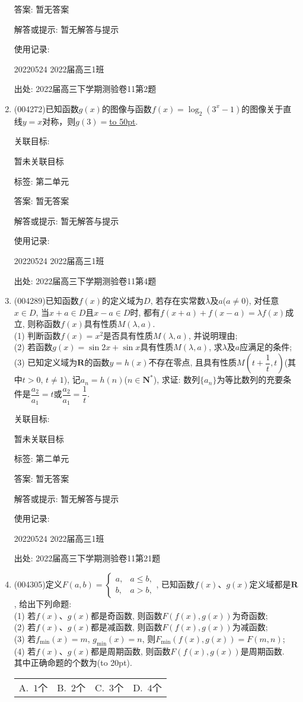 \documentclass[10pt,a4paper]{article}
\newcommand{\blank}[1]{\underline{\hbox to #1pt{}}}
\newcommand{\bracket}[1]{(\hbox to #1pt{})}
\newcommand{\fourch}[4]{\par\begin{tabular}{p{.23\textwidth}p{.23\textwidth}p{.23\textwidth}p{.23\textwidth}}
A.~#1 &B.~#2& C.~#3& D.~#4
\end{tabular}}
\begin{document}
\begin{enumerate}[1.]
答案: 暂无答案

解答或提示: 暂无解答与提示

使用记录:

20220524	2022届高三1班	


出处: 2022届高三下学期测验卷11第2题
\item { (004272)}已知函数$g(x)$的图像与函数$f(x)=\log_2(3^x-1)$的图像关于直线$y=x$对称，则$g(3)=$\blank{50}.


关联目标:

暂未关联目标



标签: 第二单元

答案: 暂无答案

解答或提示: 暂无解答与提示

使用记录:

20220524	2022届高三1班	


出处: 2022届高三下学期测验卷11第4题
\item { (004289)}已知函数$f(x)$的定义域为$D$, 若存在实常数$\lambda$及$a$($a\ne 0$), 对任意$x\in D$, 当$x+a\in D$且$x-a\in D$时, 都有$f(x+a)+f(x-a)=\lambda f(x)$成立, 则称函数$f(x)$具有性质$M(\lambda,a)$.\\
(1) 判断函数$f(x)=x^2$是否具有性质$M(\lambda,a)$, 并说明理由;\\
(2) 若函数$g(x)=\sin 2x+\sin x$具有性质$M(\lambda,a)$, 求$\lambda$及$a$应满足的条件;\\
(3) 已知定义域为$\mathbf{R}$的函数$y=h(x)$不存在零点, 且具有性质$M(t+\dfrac{1}{t},t)$(其中$t>0$, $t\ne 1$), 记$a_n=h(n)$($n\in \mathbf{N}^*$), 求证: 数列$\{a_n\}$为等比数列的充要条件是$\dfrac{a_2}{a_1}=t$或$\dfrac{a_2}{a_1}=\dfrac{1}{t}$.


关联目标:

暂未关联目标



标签: 第二单元

答案: 暂无答案

解答或提示: 暂无解答与提示

使用记录:

20220524	2022届高三1班			


出处: 2022届高三下学期测验卷11第21题
\item { (004305)}定义$F(a,b)=\begin{cases} a, & a \le b, \\ b, & a>b,\end{cases}$, 已知函数$f(x)$、$g(x)$定义域都是$\mathbf{R}$, 给出下列命题:\\
(1) 若$f(x)$、$g(x)$都是奇函数, 则函数$F(f(x),g(x))$为奇函数;\\
(2) 若$f(x)$、$g(x)$都是减函数, 则函数$F(f(x),g(x))$为减函数;\\
(3) 若$f_{\min}(x)=m$, $g_{\min}(x)=n$, 则$F_{\min}(f(x),g(x))=F(m,n)$;\\
(4) 若$f(x)$、$g(x)$都是周期函数, 则函数$F(f(x),g(x))$是周期函数.\\
其中正确命题的个数为\bracket{20}.
\fourch{$1$个}{$2$个}{$3$个}{$4$个}



\end{enumerate}
\end{document}
